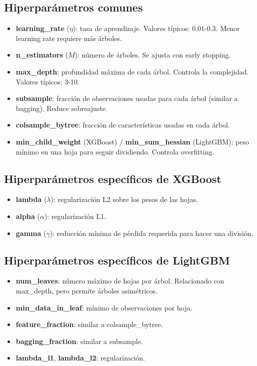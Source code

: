 \documentclass[12pt,a4paper,openany,oneside]{book}
\begin{document}
\subsection{Hiperparámetros comunes}
\begin{itemize}
    \item \textbf{learning\_rate} (\(\eta\)): tasa de aprendizaje. Valores típicos: 0.01-0.3. Menor learning rate requiere más árboles.
    \item \textbf{n\_estimators} (\(M\)): número de árboles. Se ajusta con early stopping.
    \item \textbf{max\_depth}: profundidad máxima de cada árbol. Controla la complejidad. Valores típicos: 3-10.
    \item \textbf{subsample}: fracción de observaciones usadas para cada árbol (similar a bagging). Reduce sobreajuste.
    \item \textbf{colsample\_bytree}: fracción de características usadas en cada árbol.
    \item \textbf{min\_child\_weight} (XGBoost) / \textbf{min\_sum\_hessian} (LightGBM): peso mínimo en una hoja para seguir dividiendo. Controla overfitting.
\end{itemize}

\subsection{Hiperparámetros específicos de XGBoost}
\begin{itemize}
    \item \textbf{lambda} (\(\lambda\)): regularización L2 sobre los pesos de las hojas.
    \item \textbf{alpha} (\(\alpha\)): regularización L1.
    \item \textbf{gamma} (\(\gamma\)): reducción mínima de pérdida requerida para hacer una división.
\end{itemize}

\subsection{Hiperparámetros específicos de LightGBM}
\begin{itemize}
    \item \textbf{num\_leaves}: número máximo de hojas por árbol. Relacionado con max\_depth, pero permite árboles asimétricos.
    \item \textbf{min\_data\_in\_leaf}: mínimo de observaciones por hoja.
    \item \textbf{feature\_fraction}: similar a colsample\_bytree.
    \item \textbf{bagging\_fraction}: similar a subsample.
    \item \textbf{lambda\_l1}, \textbf{lambda\_l2}: regularización.
\end{itemize}
\end{document}
